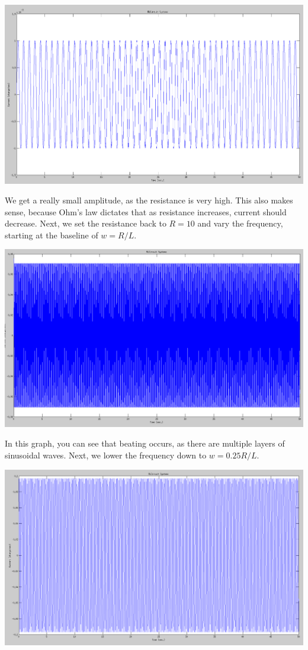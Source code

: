 \documentclass[titlepage,12pt]{article}
\begin{document}
\begin{center}
  \includegraphics[scale=0.25]{r1000l01w2pi.png}
\end{center}

\noindent We get a really small amplitude, as the resistance is very high. This also makes sense, because Ohm's law dictates that as resistance increases, current should decrease. Next, we set the resistance back to $R = 10$ and vary the frequency, starting at the baseline of $w = R/L$.

\begin{center}
  \includegraphics[scale=0.25]{r10l01wrl.png}
\end{center}

\noindent In this graph, you can see that beating occurs, as there are multiple layers of sinusoidal waves. Next, we lower the frequency down to $w = 0.25R/L$.

\begin{center}
  \includegraphics[scale=0.25]{r10l01w025rl.png}
\end{center}
\end{document}
